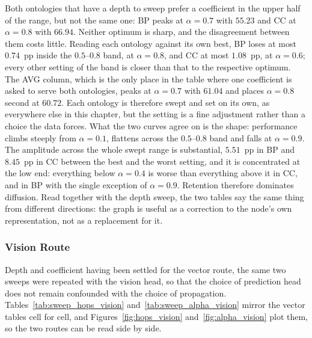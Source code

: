 \documentclass[Ingles]{ic-tese-v3}
\begin{document}
Both ontologies that have a depth to sweep prefer a coefficient in the upper half of the
range, but not the same one: BP peaks at $\alpha = 0.7$ with $55.23$ and CC at
$\alpha = 0.8$ with $66.94$. Neither optimum is sharp, and the disagreement between them
costs little. Reading each ontology against its own best, BP loses at most $0.74$~pp inside
the $0.5$--$0.8$ band, at $\alpha = 0.8$, and CC at most $1.08$~pp, at $\alpha = 0.6$; every
other setting of the band is closer than that to the respective optimum. The AVG column,
which is the only place in the table where one coefficient is asked to serve both
ontologies, peaks at $\alpha = 0.7$ with $61.04$ and places $\alpha = 0.8$ second at
$60.72$. Each ontology is therefore swept and set on its own, as everywhere else in this
chapter, but the setting is a fine adjustment rather than a choice the data forces.
What the two curves agree on is the shape: performance climbs steeply from $\alpha = 0.1$,
flattens across the $0.5$--$0.8$ band and falls at $\alpha = 0.9$. The amplitude across the
whole swept range is substantial, $5.51$~pp in BP and $8.45$~pp in CC between the best and
the worst setting, and it is concentrated at the low end: everything below $\alpha = 0.4$ is
worse than everything above it in CC, and in BP with the single exception of $\alpha = 0.9$. Retention therefore dominates diffusion. Read together with the depth sweep, the two tables
say the same thing from different directions: the graph is useful as a correction to the
node's own representation, not as a replacement for it.

\subsubsection{Vision Route}

Depth and coefficient having been settled for the vector route, the same two sweeps were
repeated with the vision head, so that the choice of prediction head does not remain
confounded with the choice of propagation. Tables~\ref{tab:sweep_hops_vision}
and~\ref{tab:sweep_alpha_vision} mirror the vector tables cell for cell, and
Figures~\ref{fig:hops_vision} and~\ref{fig:alpha_vision} plot them, so the two routes can
be read side by side.
\end{document}
